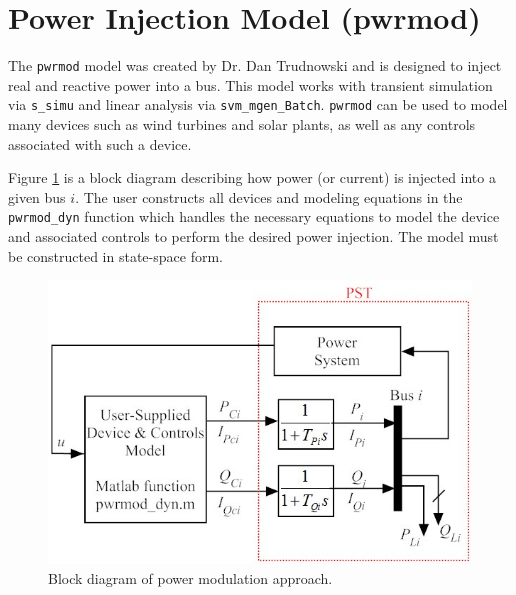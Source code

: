 \section{Power Injection Model (pwrmod)}  

The \verb|pwrmod| model was created by Dr. Dan Trudnowski and is designed to inject real and reactive power into a bus.
This model works with transient simulation via \verb|s_simu| and linear analysis via \verb|svm_mgen_Batch|.
\verb|pwrmod| can be used to model many devices such as wind turbines and solar plants, as well as any controls associated with such a device.

Figure \ref{fig: pwrmod BD} is a block diagram describing how power (or current) is injected into a given bus $i$.
The user constructs all devices and modeling equations in the \verb|pwrmod_dyn| function which handles the necessary equations to model the device and associated controls to perform the desired power injection.
The model must be constructed in state-space form.

\begin{figure}[H]
	\centering
	\footnotesize
	\includegraphics[width=.75\linewidth]{sections/pwrmod/BlockDiagram1}
	\caption{Block diagram of power modulation approach.}
	\label{fig: pwrmod BD}
\end{figure}%

